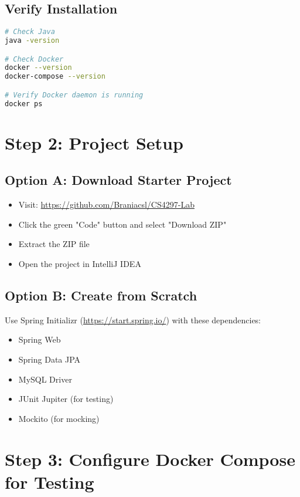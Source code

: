 \documentclass[12pt,a4paper]{article}
\begin{document}
\subsection{Verify Installation}

\begin{lstlisting}[language=bash, caption=Verify all tools are installed]
# Check Java
java -version

# Check Docker
docker --version
docker-compose --version

# Verify Docker daemon is running
docker ps
\end{lstlisting}

\section{Step 2: Project Setup}

\subsection{Option A: Download Starter Project}

\begin{itemize}
    \item Visit: \url{https://github.com/Braniacsl/CS4297-Lab}
    \item Click the green "Code" button and select "Download ZIP"
    \item Extract the ZIP file
    \item Open the project in IntelliJ IDEA
\end{itemize}

\subsection{Option B: Create from Scratch}

Use Spring Initializr (\url{https://start.spring.io/}) with these dependencies:

\begin{itemize}
    \item Spring Web
    \item Spring Data JPA
    \item MySQL Driver
    \item JUnit Jupiter (for testing)
    \item Mockito (for mocking)
\end{itemize}

\section{Step 3: Configure Docker Compose for Testing}
\end{document}
